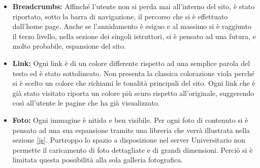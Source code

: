 \begin{itemize}
\item \textbf{Breadcrumbs:} Affinché l'utente non si perda mai all'interno del sito, è stato riportato, sotto la barra di navigazione, il percorso che si è effettuato dall'home page. Anche se l'annidamento è esiguo e al massimo si è raggiunto il terzo livello, nella sezione dei singoli istruttori, si è pensato ad una futura, e molto probabile, espansione del sito.

\item \textbf{Link:} Ogni link è di un colore differente rispetto ad una semplice parola del testo ed è stato sottolineato. Non presenta la classica colorazione viola perché si è scelto un colore che richiami le tonalità principali del sito. Ogni link che è già stato visitato riporta un colore più scuro rispetto all'originale, suggerendo così all'utente le pagine che ha già visualizzato.

\item \textbf{Foto:} Ogni immagine è nitida e ben visibile. Per ogni foto di contenuto si è pensato ad una sua espansione tramite una libreria che verrà illustrata nella sezione \ref{js}. Purtroppo lo spazio a disposizione nel server Universitario non permette il caricamento di foto dettagliate e di grandi dimensioni. Perciò si è limitata questa possibilità alla sola galleria fotografica.  
\end{itemize}
